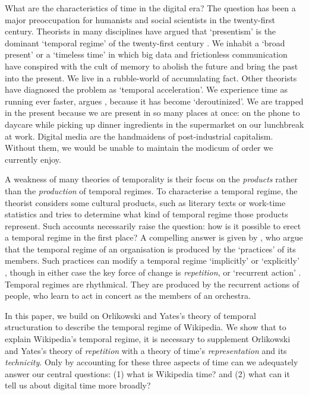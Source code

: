 \documentclass[Royal,times,sageh]{sagej}
\begin{document}
What are the characteristics of time in the digital era? The question
has been a major preoccupation for humanists and social scientists in
the twenty-first century. Theorists in many disciplines have argued that
`presentism' is the dominant `temporal regime' of the twenty-first
century \citep{assmann_is_2020, hartog_regimes_2017}. We inhabit a
`broad present' \citep{gumbrecht_our_2014} or a `timeless time'
\citep{castells_rise_2010} in which big data and frictionless
communication have conspired with the cult of memory to abolish the
future and bring the past into the present. We live in a rubble-world of
accumulating fact. Other theorists have diagnosed the problem as
`temporal acceleration'. We experience time as running ever faster,
argues \citet[p.~77]{wajcman_pressed_2015}, because it has become
`deroutinized'. We are trapped in the present because we are present in
so many places at once: on the phone to daycare while picking up dinner
ingredients in the supermarket on our lunchbreak at work. Digital media
are the handmaidens of post-industrial capitalism. Without them, we
would be unable to maintain the modicum of order we currently enjoy.

A weakness of many theories of temporality is their focus on the
\emph{products} rather than the \emph{production} of temporal regimes.
To characterise a temporal regime, the theorist considers some cultural
products, such as literary texts
\citep{gumbrecht_our_2014, hartog_regimes_2017} or work-time statistics
\citep{castells_rise_2010} and tries to determine what kind of temporal
regime those products represent. Such accounts necessarily raise the
question: how is it possible to erect a temporal regime in the first
place? A compelling answer is given by \citet{orlikowski_its_2002}, who
argue that the temporal regime of an organisation is produced by the
`practices' of its members. Such practices can modify a temporal regime
`implicitly' or `explicitly' \citeyearpar[p.~687]{orlikowski_its_2002},
though in either case the key force of change is \emph{repetition}, or
`recurrent action' \citeyearpar[p.~696]{orlikowski_its_2002}. Temporal
regimes are rhythmical. They are produced by the recurrent actions of
people, who learn to act in concert as the members of an orchestra.

In this paper, we build on Orlikowski and Yates's theory of temporal
structuration to describe the temporal regime of Wikipedia. We show that
to explain Wikipedia's temporal regime, it is necessary to supplement
Orlikowski and Yates's theory of \emph{repetition} with a theory of
time's \emph{representation} and its \emph{technicity}. Only by
accounting for these three aspects of time can we adequately answer our
central questions: (1) what is Wikipedia time? and (2) what can it tell
us about digital time more broadly?
\end{document}
